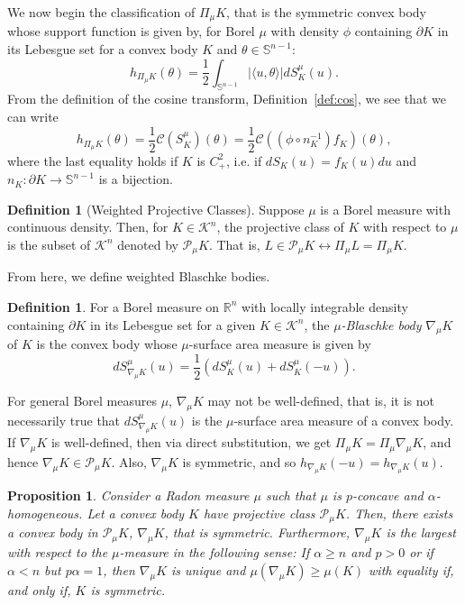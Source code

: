 \documentclass[11pt]{amsart}
\newtheorem{proposition}[theorem]{Proposition}
\theoremstyle{definition}
\newtheorem{definition}[theorem]{Definition}
\theoremstyle{remark}
\numberwithin{equation}{section}
\newcommand{\R}{\mathbb{R}}
\newcommand{\s}{\mathbb{S}}
\newcommand{\conbod}{\mathcal{K}^n}
\newcommand{\ct}[2]{\mathcal{C}({#1})({#2})}
\begin{document}
We now begin the classification of $\Pi_\mu K$, that is the symmetric convex body whose support function is given by, for Borel $\mu$ with density $\phi$ containing $\partial K$ in its Lebesgue set for a convex body $K$ and $\theta\in\s^{n-1}$:
$$h_{\Pi_{\mu} K}(\theta)=\frac{1}{2}\int_{\s^{n-1}}|\langle u,\theta\rangle|dS^{\mu}_{K}(u).$$ From the definition of the cosine transform, Definition~\ref{def:cos}, we see that we can write
\begin{equation}
h_{\Pi_{\mu} K}(\theta)=\frac{1}{2}\ct{S^\mu_K}{\theta}=\frac{1}{2}\ct{\left(\phi\circ n_K^{-1}\right)f_K}{\theta},
\label{eq:supp_cos}
\end{equation}
where the last equality holds if $K$ is $C^2_+$, i.e. if $dS_K(u)=f_K(u)du$ and $n_K:\partial K\to \s^{n-1}$ is a bijection.
\begin{definition}[Weighted Projective Classes]
Suppose $\mu$ is a Borel measure with continuous density. Then, for $K\in\conbod$, the projective class of $K$ with respect to $\mu$ is the subset of $\conbod$ denoted by $\mathcal{P}_\mu K.$ That is, $L\in\mathcal{P}_\mu K \leftrightarrow \Pi_\mu L = \Pi_\mu K.$ 
\end{definition}
From here, we define weighted Blaschke bodies.
\begin{definition}
For a Borel measure on $\R^n$ with locally integrable density containing $\partial K$ in its Lebesgue set for a given $K\in\conbod$, the \textit{$\mu$-Blaschke body} $\nabla_\mu K$ of $K$ is the convex body whose $\mu$-surface area measure is given by
$$dS^{\mu}_{\nabla_\mu K}(u)=\frac{1}{2}\left(dS^{\mu}_{K}(u) + dS^{\mu}_{K}(-u)\right).$$
\end{definition}
For general Borel measures $\mu$, $\nabla_\mu K$ may not be well-defined, that is, it is not necessarily true that $dS^{\mu}_{\nabla_\mu K}(u)$ is the $\mu$-surface area measure of a convex body. If $\nabla_\mu K$ is well-defined, then via direct substitution, we get $\Pi_\mu K = \Pi_\mu \nabla_\mu K$, and hence $\nabla_\mu K\in \mathcal{P}_\mu K$. Also, $\nabla_\mu K$ is symmetric, and so $h_{\nabla_\mu K}(-u)=h_{\nabla_\mu K}(u)$.
\begin{proposition}
\label{p:even_class}
Consider a Radon measure $\mu$ such that $\mu$ is $p$-concave and $\alpha$- homogeneous. Let a convex body $K$ have projective class $\mathcal{P}_\mu K$. Then, there exists a convex body in $\mathcal{P}_\mu K$, $\nabla_\mu K$, that is symmetric. Furthermore, $\nabla_\mu K$ is the largest with respect to the $\mu$-measure in the following sense:
    If $\alpha \geq n$ and $p>0$ or if $\alpha < n$ but  $p\alpha =1$, then  $\nabla_\mu K$ is unique and $\mu(\nabla_\mu K)\geq \mu(K)$ with equality if, and only if, $K$ is symmetric.
\end{proposition}
\end{document}
